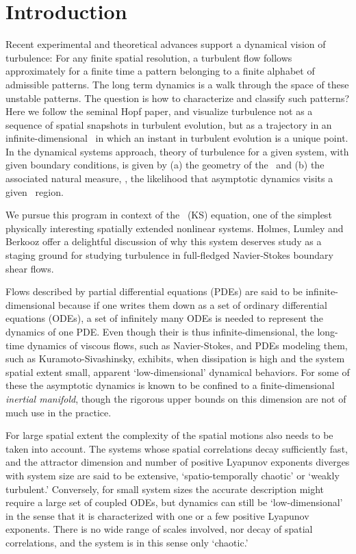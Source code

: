 
\section{Introduction}

Recent experimental and theoretical advances
support a dynamical vision of turbulence:
For any finite  spatial resolution,
a turbulent flow follows approximately for a finite time
a pattern belonging to a
{ finite alphabet}
of admissible patterns.
The long term dynamics is
a {walk through the space of these unstable patterns}.
The question is how to characterize and classify such patterns?
Here we follow the seminal Hopf paper, and  visualize
turbulence not as  a sequence of
spatial snapshots in turbulent evolution,
but as a trajectory in an
 infinite-dimensional \statesp\ in which an
instant in turbulent evolution is
a {unique} point. In the dynamical systems approach,
theory of turbulence for a given system, with given boundary conditions,
is given by
(a) the geometry of the \statesp\ and (b) the associated natural measure,
\ie,
the likelihood that asymptotic dynamics visits a given \statesp\ region.

We pursue this program in context of the \KS\ (KS) equation,
one of the simplest physically interesting spatially extended
nonlinear systems.  Holmes, Lumley and Berkooz offer a
delightful discussion of why this system deserves study as a staging
ground for studying turbulence in full-fledged Navier-Stokes
boundary shear flows.

Flows described by partial differential equations (PDEs) are
said to be infinite-dimensional because if one writes them
down as a set of ordinary differential equations (ODEs), a set
of infinitely many ODEs is needed to represent the dynamics
of one PDE. Even though their {\statesp} is thus
infinite-dimensional, the long-\-time dynamics of viscous
flows, such as Navier-Stokes, and PDEs modeling them, such as
Kuramoto-Sivashinsky, exhibits, when dissipation is high and
the system spatial extent small, apparent `low-dimensional'
dynamical behaviors. For some of these the asymptotic
dynamics is known to be confined to a finite-\-dimensional
{\em inertial manifold}, though the rigorous upper bounds on
this dimension are not of much use in the practice.

For large spatial extent the complexity of the spatial
motions also needs to be taken into account. The systems
whose spatial correlations decay sufficiently fast, and the
attractor dimension and number of positive Lyapunov exponents
diverges with system size are said
to be extensive, `spatio-temporally chaotic' or `weakly
turbulent.' Conversely, for small system sizes the accurate
description might require a large set of coupled
ODEs, but dynamics can still be `low-dimensional' in the
sense that it is characterized with one or a few positive
Lyapunov exponents. There is no wide range of scales
involved, nor decay of spatial correlations, and the system
is in this sense only `chaotic.'


